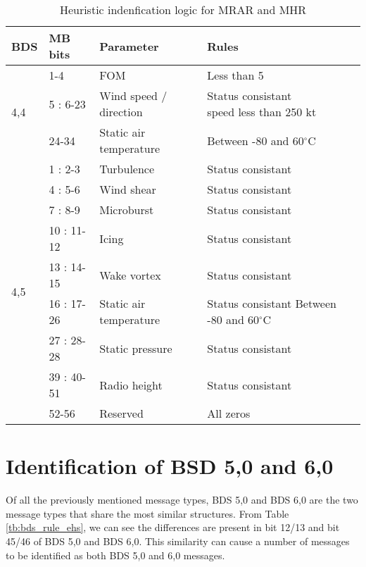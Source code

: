 \begin{table}
\footnotesize
\centering
\small
\caption{Heuristic indenfication logic for MRAR and MHR}
\label{tb:bds_rule_mrar}
\begin{tabular}{|l|l|l|l|}
\hline
\textbf{BDS} & \textbf{MB bits} & \textbf{Parameter} & \textbf{Rules} \\ \hline \hline
\multirow{3}{*}{4,4} & 1-4 & FOM & Less than 5 \\ \cline{2-4} 
& 5 : 6-23 & Wind speed / direction & \makecell*{Status consistant \\ speed less than 250 kt} \\ \cline{2-4} 
& 24-34 & Static air temperature & Between -80 and 60$^\circ$C \\ \hline \hline
\multirow{9}{*}{4,5} & 1 : 2-3 & Turbulence & Status consistant \\ \cline{2-4} 
& 4 : 5-6 & Wind shear & Status consistant \\ \cline{2-4} 
& 7 : 8-9 & Microburst & Status consistant \\ \cline{2-4} 
& 10 : 11-12 & Icing & Status consistant \\ \cline{2-4} 
& 13 : 14-15 & Wake vortex & Status consistant \\ \cline{2-4} 
& 16 : 17-26 & Static air temperature & \makecell*{Status consistant \\ Between -80 and 60$^\circ$C} \\ \cline{2-4} 
& 27 : 28-28 & Static pressure & Status consistant \\ \cline{2-4} 
& 39 : 40-51 & Radio height & Status consistant \\ \cline{2-4} 
& 52-56 & Reserved & All zeros \\ \hline
\end{tabular}
\end{table}




\section{Identification of BSD 5,0 and 6,0}

Of all the previously mentioned message types, BDS 5,0 and BDS 6,0 are the two message types that share the most similar structures. From Table \ref{tb:bds_rule_ehs}, we can see the differences are present in bit 12/13 and bit 45/46 of BDS 5,0 and BDS 6,0. This similarity can cause a number of messages to be identified as both BDS 5,0 and 6,0 messages.

